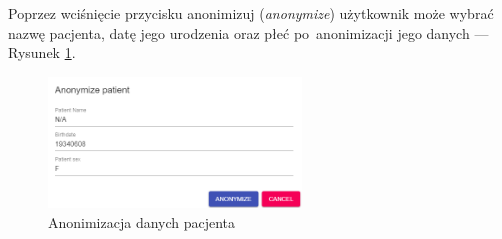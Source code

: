 \documentclass[a4paper,11pt,twoside,openright]{report}
\theoremstyle{definition}
\begin{document}
Poprzez wciśnięcie przycisku anonimizuj (\textit{anonymize}) użytkownik może wybrać nazwę
pacjenta, datę jego urodzenia oraz płeć po~anonimizacji jego danych --- Rysunek \ref{fig:19}.

\begin{figure}[h!]
	\center
	\includegraphics[width=0.6\textwidth]{19}
	\caption{Anonimizacja danych pacjenta}
    	\label{fig:19}
\end{figure}



\end{document}
